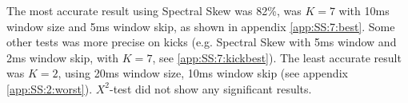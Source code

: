 		
		The most accurate result using Spectral Skew was 82\%, was $K=7$ with 10ms window size and 5ms window skip, as shown in appendix \ref{app:SS:7:best}. Some other tests was more precise on kicks (e.g. Spectral Skew with 5ms window and 2ms window skip, with $K=7$, see \ref{app:SS:7:kickbest}). The least accurate result was $K=2$, using 20ms window size, 10ms window skip (see appendix \ref{app:SS:2:worst}). $X^2$-test did not show any significant results.
	
